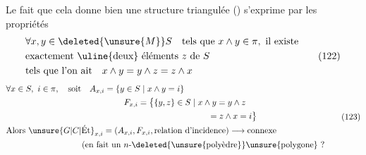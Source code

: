 Le fait que cela donne bien une structure triangulée () s'exprime par les  propriétés
\[
\begin{aligned}
&\forall x,y\in\deleted{\unsure{M}}S\quad\text{tels que }x\wedge y\in\pi,\ \text{il existe}\\
&\text{exactement \uline{deux} éléments }z\text{ de }S\\
&\text{tels que l'on ait}\quad x\wedge y=y\wedge z=z\wedge x
\end{aligned}\tag*{(122)}
\]
\[
\begin{aligned}
&\forall x\in S,\ i\in\pi,\quad\text{soit}\quad A_{x,i}=\{y\in S\mid x\wedge y=i\}\\
&\hspace{14em}F_{x,i}=\bigl\{\{y,z\}\in S\mid x\wedge y=y\wedge z\\
&\hspace{24em}=z\wedge x=i\bigr\}\\
&\text{Alors }\unsure{G|C|\mathrm{\acute Et}}_{x,i}=(A_{x,i},F_{x,i},\text{relation d'incidence})\longrightarrow \text{connexe}\\
&\hspace{9em}\text{(en fait un $n$-\deleted{\unsure{polyèdre}}\unsure{polygone} ?}
\end{aligned}\tag*{(123)}
\]
